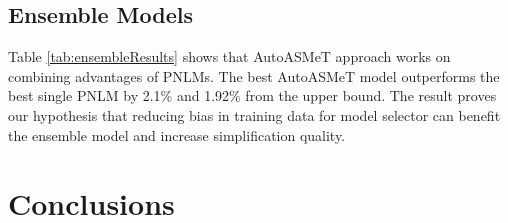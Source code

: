 \documentclass[11pt]{article}
\begin{document}
\begin{table}[t]
\centering
{}
\caption{\label{tab:ensembleResults} ABP of the ensemble models}
\end{table}
\subsection{Ensemble Models}

Table \ref{tab:ensembleResults} shows that AutoASMeT approach works on combining advantages of PNLMs. The best AutoASMeT model outperforms the best single PNLM by 2.1\% and 1.92\% from the upper bound. The result proves our hypothesis that reducing bias in training data for model selector can benefit the ensemble model and increase simplification quality.


\section{Conclusions}
\end{document}
